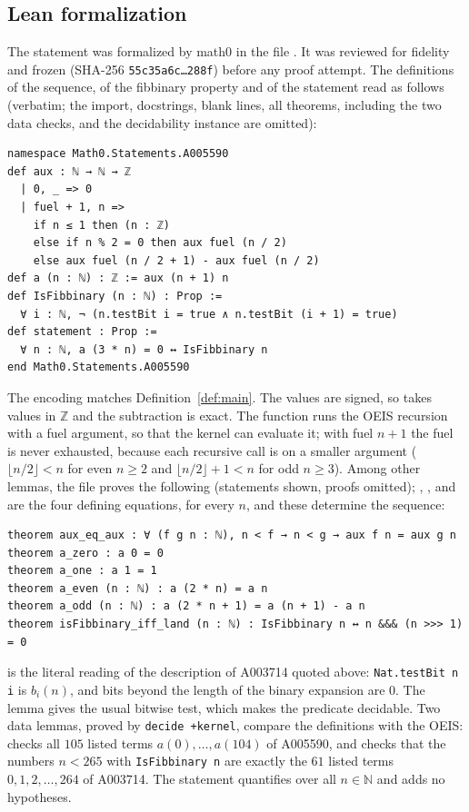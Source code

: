 \documentclass[11pt]{amsart}
\theoremstyle{plain}
\theoremstyle{definition}
\newcommand{\N}{\mathbb{N}}
\newcommand{\Z}{\mathbb{Z}}
\begin{document}
\subsection*{Lean formalization}
The statement was formalized by math0 in the file . It was reviewed for fidelity and frozen (SHA-256 \texttt{55c35a6c\ldots 288f}) before any proof attempt. The definitions of the sequence, of the fibbinary property and of the statement read as follows (verbatim; the import, docstrings, blank lines, all theorems, including the two data checks, and the decidability instance are omitted):
\begin{lstlisting}
namespace Math0.Statements.A005590
def aux : ℕ → ℕ → ℤ
  | 0, _ => 0
  | fuel + 1, n =>
    if n ≤ 1 then (n : ℤ)
    else if n % 2 = 0 then aux fuel (n / 2)
    else aux fuel (n / 2 + 1) - aux fuel (n / 2)
def a (n : ℕ) : ℤ := aux (n + 1) n
def IsFibbinary (n : ℕ) : Prop :=
  ∀ i : ℕ, ¬ (n.testBit i = true ∧ n.testBit (i + 1) = true)
def statement : Prop :=
  ∀ n : ℕ, a (3 * n) = 0 ↔ IsFibbinary n
end Math0.Statements.A005590
\end{lstlisting}
The encoding matches Definition~\ref{def:main}.
The values are signed, so  takes values in $\Z$ and the subtraction is exact.
The function  runs the OEIS recursion with a fuel argument, so that the kernel can evaluate it; with fuel $n+1$ the fuel is never exhausted, because each recursive call is on a smaller argument ($\lfloor n/2\rfloor<n$ for even $n\ge2$ and $\lfloor n/2\rfloor+1<n$ for odd $n\ge3$).
Among other lemmas, the file proves the following (statements shown, proofs omitted); , ,  and  are the four defining equations, for every $n$, and these determine the sequence:
\begin{lstlisting}
theorem aux_eq_aux : ∀ (f g n : ℕ), n < f → n < g → aux f n = aux g n
theorem a_zero : a 0 = 0
theorem a_one : a 1 = 1
theorem a_even (n : ℕ) : a (2 * n) = a n
theorem a_odd (n : ℕ) : a (2 * n + 1) = a (n + 1) - a n
theorem isFibbinary_iff_land (n : ℕ) : IsFibbinary n ↔ n &&& (n >>> 1) = 0
\end{lstlisting}
 is the literal reading of the description of A003714 quoted above: \texttt{Nat.testBit n i} is $b_i(n)$, and bits beyond the length of the binary expansion are $0$.
The lemma  gives the usual bitwise test, which makes the predicate decidable.
Two data lemmas, proved by \texttt{decide +kernel}, compare the definitions with the OEIS:  checks all $105$ listed terms $a(0),\dots,a(104)$ of A005590, and  checks that the numbers $n<265$ with \texttt{IsFibbinary n} are exactly the $61$ listed terms $0,1,2,\dots,264$ of A003714.
The statement quantifies over all $n\in\N$ and adds no hypotheses.
\end{document}
